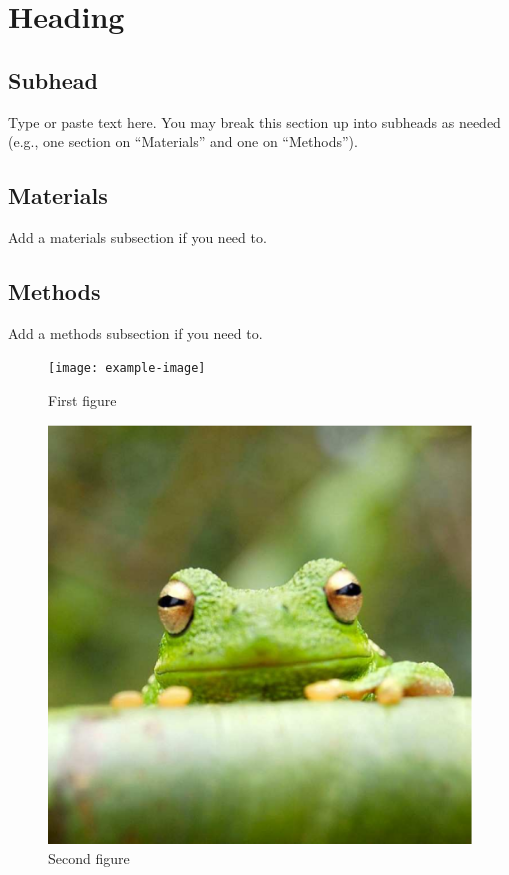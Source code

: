 \documentclass[9pt,twoside,lineno]{pnas-new}
\begin{document}
\section*{Heading}
\subsection*{Subhead}
Type or paste text here. You may break this section up into subheads as needed (e.g., one section on ``Materials'' and one on ``Methods'').

\subsection*{Materials}
Add a materials subsection if you need to.

\subsection*{Methods}
Add a methods subsection if you need to.


\begin{figure}
\centering
\texttt{[image: example-image]}
\caption{First figure}
\end{figure}

\begin{figure}
\centering
\includegraphics[width=\textwidth]{frog}
\caption{Second figure}
\end{figure}
\end{document}
